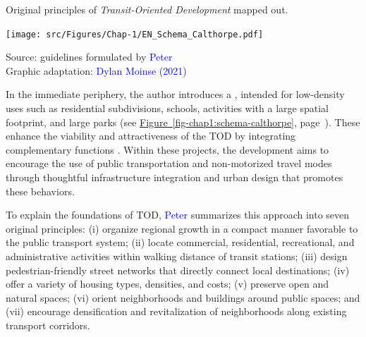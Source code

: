 \begin{refsegment}
    \begin{carte}[h!]\vspace*{4pt}
        \caption{Original principles of \textsl{Transit-Oriented Development} mapped out.}
        \label{fig-chap1:schema-calthorpe}
        \centerline{\texttt{[image: src/Figures/Chap-1/EN\_Schema\_Calthorpe.pdf]}}
        \vspace{5pt}
        \begin{flushright}\scriptsize{
        Source: guidelines formulated by \textcolor{blue}{Peter} \textcolor{blue}{\textcite{calthorpe_next_1993}}
        \\
        Graphic adaptation: \textcolor{blue}{Dylan Moinse (2021)}
        }\end{flushright}
    \end{carte}

In the immediate periphery, the author introduces a , intended for low-density uses such as residential subdivisions, schools, activities with a large spatial footprint, and large parks (see \hyperref[fig-chap1:schema-calthorpe]{Figure~\ref{fig-chap1:schema-calthorpe}}, page~\pageref{fig-chap1:schema-calthorpe}). These  enhance the viability and attractiveness of the \acrshort{TOD} by integrating complementary functions \textcolor{blue}{\autocite[42, 60, 87]{calthorpe_next_1993}}. Within these projects, the development aims to encourage the use of public transportation and non-motorized travel modes through thoughtful infrastructure integration and urban design that promotes these behaviors.%

To explain the foundations of \acrshort{TOD}, \textcolor{blue}{Peter} \textcolor{blue}{\textcite[43]{calthorpe_next_1993}} summarizes this approach into seven original principles: (i) organize regional growth in a compact manner favorable to the public transport system; (ii) locate commercial, residential, recreational, and administrative activities within walking distance of transit stations; (iii) design pedestrian-friendly street networks that directly connect local destinations; (iv) offer a variety of housing types, densities, and costs; (v) preserve open and natural spaces; (vi) orient neighborhoods and buildings around public spaces; and (vii) encourage densification and revitalization of neighborhoods along existing transport corridors.%


\end{refsegment}
